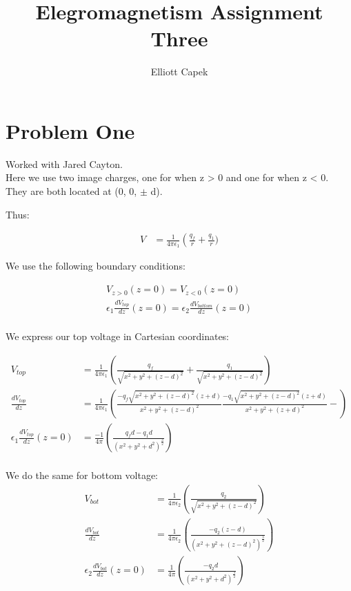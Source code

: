 \documentclass[10pt]{article} %
\title{Elegromagnetism Assignment Three}
\author{Elliott Capek}
\begin{document}
\maketitle{}

\section{Problem One}
Worked with Jared Cayton.\\
Here we use two image charges, one for when z > 0 and one for when z < 0. They are both located at (0, 0, $\pm$ d).

Thus:

\begin{align*}
	V &= \frac{1}{4\pi\epsilon_1}\left(\frac{q_f}{r} + \frac{q_1}{r})
\end{align*}

We use the following boundary conditions:

\begin{align*}
	V_{z>0}(z=0) = V_{z<0}(z=0)\\
	\epsilon_1\frac{dV_{top}}{dz}(z=0) = \epsilon_2\frac{dV_{bottom}}{dz}(z=0)\\
\end{align*}

We express our top voltage in Cartesian coordinates:

\begin{align*}
  V_{top} &= \frac{1}{4\pi\epsilon_1} \left(\frac{q_f}{\sqrt{x^2+y^2+(z-d)^2}} + \frac{q_1}{\sqrt{x^2+y^2+(z-d)^2}}\right)\\
  \frac{dV_{top}}{dz} &= \frac{1}{4\pi\epsilon_1}\left(\frac{-q_f\sqrt{x^2+y^2+(z-d)^2}(z+d)}{x^2+y^2+(z-d)^2}
  \frac{-q_1\sqrt{x^2+y^2+(z-d)^2}(z+d)}{x^2+y^2+(z+d)^2} - \right)\\
  \epsilon_1 \frac{dV_{top}}{dz}(z=0) &= \frac{-1}{4\pi}\left(\frac{q_fd-q_1d}{\left(x^2+y^2+d^2\right)^{\frac32}}\right)\\
\end{align*}

We do the same for bottom voltage:
\begin{align*}
  V_{bot} &= \frac{1}{4\pi\epsilon_2} \left(\frac{q_2}{\sqrt{x^2+y^2+(z-d)^2}}\right)\\
  \frac{dV_{bot}}{dz} &= \frac{1}{4\pi\epsilon_2}\left(\frac{-q_2\left(z-d\right)}{\left(x^2+y^2+(z-d)^2\right)^{\frac32}}\right)\\
  \epsilon_2 \frac{dV_{bot}}{dz}(z=0) &= \frac{1}{4\pi}\left(\frac{-q_2d}{\left(x^2+y^2+d^2\right)^{\frac32}}\right)\\
\end{align*}
\end{document}
